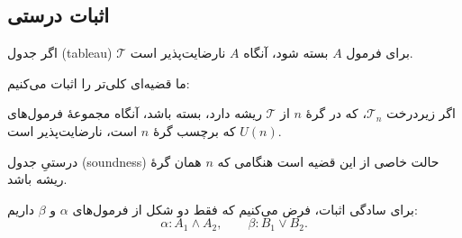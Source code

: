 \subsection*{ اثبات درستی}
  
  \begin{theorem}
  اگر جدول (tableau) \(\mathscr{T}\) برای فرمول \(A\) بسته شود، آنگاه \(A\) نارضایت‌پذیر  است.
  \end{theorem}
  
  ما قضیه‌ای کلی‌تر را اثبات می‌کنیم:
  
  \begin{theorem}
  اگر زیر‌درخت \(\mathscr{T}_n\)، که در گرهٔ \(n\) از \(\mathscr{T}\) ریشه دارد، بسته باشد، آنگاه مجموعهٔ فرمول‌های \(U(n)\) که برچسب گرهٔ \(n\) است، نارضایت‌پذیر است.
  \end{theorem}
  
  درستیِ جدول (soundness) حالت خاصی از این قضیه است هنگامی که \(n\) همان گرهٔ ریشه باشد.
  
  برای سادگی اثبات، فرض می‌کنیم که فقط دو شکل از فرمول‌های \(\alpha\) و \(\beta\) داریم:
  \[
  \alpha\colon A_1 \land A_2,
  \qquad
  \beta\colon B_1 \lor B_2.
  \]
  
